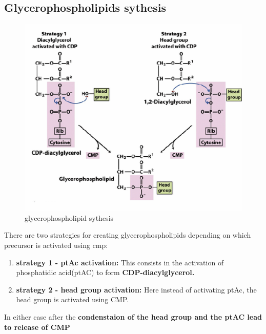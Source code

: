 \documentclass[../main.tex]{subfiles}
\begin{document}
\subsection{Glycerophospholipids sythesis}
\begin{figure}[H]
    \centering
    \includegraphics[width=0.5\linewidth]{Sum_BC_II//lectures//bcII7+bcII8/glycerophospholipid.png}
    \caption{glycerophospholipid sythesis}
    \label{fig:enter-label}
\end{figure}
There are two strategies for creating glycerophospholipids depending on which precursor is activated using cmp:
\begin{enumerate}
    \item \textbf{strategy 1 - ptAc activation:} This consists in the activation of phosphatidic acid(ptAC) to form \textbf{CDP-diacylglycerol.}

    \item \textbf{strategy 2 - head group activation:} Here instead of activating ptAc, the head group is activated using CMP.
\end{enumerate}

In either case after the\textbf{ condenstaion of the head group and the ptAC lead to release of CMP}
\end{document}
